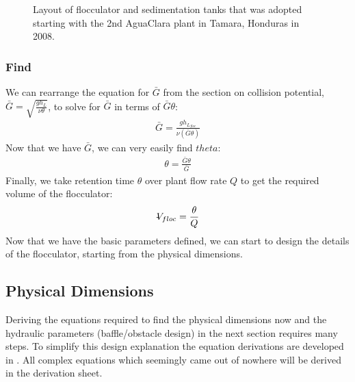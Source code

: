 \documentclass[letterpaper,10pt,english]{sphinxmanual}
\let\sphinxpxdimen\pdfpxdimen\else\newdimen\sphinxpxdimen
\begin{document}
\begin{figure}[htbp]
\centering
\capstart

\noindent\sphinxincludegraphics[width=600\sphinxpxdimen]{{Physical_design_criteria}.jpg}
\caption{Layout of flocculator and sedimentation tanks that was adopted starting with the 2nd AguaClara plant in Tamara, Honduras in 2008.}\label{\detokenize{Flocculation/Floc_Design:id17}}\label{\detokenize{Flocculation/Floc_Design:figure-physical-design-criteria-floc}}\end{figure}


\subsubsection{Find}
\label{\detokenize{Flocculation/Floc_Design:find}}
We can rearrange the equation for \(\bar G\) from the section on collision potential, \(\bar G = \sqrt{\frac{g h_L}{\nu \theta}}\), to solve for \(\bar G\) in terms of \(\bar G \theta\):
\begin{equation}\label{equation:Flocculation/Floc_Design:Flocculation/Floc_Design:15}
\begin{split}\bar G = \frac{g h_{L_{floc}}}{\nu (\bar G \theta)}\end{split}
\end{equation}
Now that we have \(\bar G\), we can very easily find \(theta\):
\begin{equation}\label{equation:Flocculation/Floc_Design:Flocculation/Floc_Design:16}
\begin{split}\theta = \frac{\bar G \theta}{\bar G}\end{split}
\end{equation}
Finally, we take retention time \(\theta\) over plant flow rate \(Q\) to get the required volume of the flocculator:
\begin{equation}\label{equation:Flocculation/Floc_Design:Flocculation/Floc_Design:17}
\begin{split}\rlap{-} V_{floc} = \frac{\theta}{Q}\end{split}
\end{equation}
Now that we have the basic parameters defined, we can start to design the details of the flocculator, starting from the physical dimensions.


\subsection{Physical Dimensions}
\label{\detokenize{Flocculation/Floc_Design:physical-dimensions}}
Deriving the equations required to find the physical dimensions now and the hydraulic parameters (baffle/obstacle design) in the next section requires many steps. To simplify this design explanation the equation derivations are developed in {\hyperref[\detokenize{Review/Review_Fluid_Mechanics_Derivations:title-review-fluid-mechanics-derivations}]{}}. All complex equations which seemingly came out of nowhere will be derived in the derivation sheet.
\end{document}
